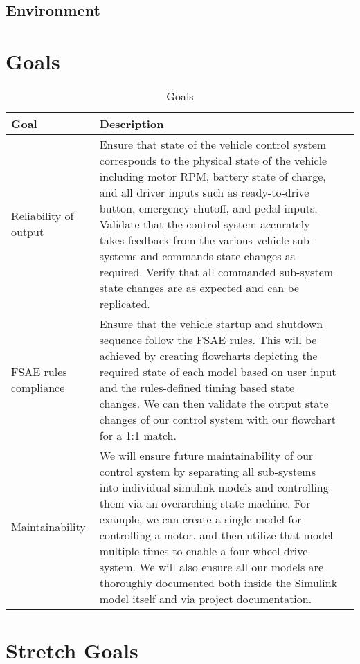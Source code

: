 \documentclass{article}
\begin{document}
\subsection{Environment}


\section{Goals}

\begin{table}[hp]
\caption{Goals} \label{TblGoals}
\begin{tabularx}{\textwidth}{llX}
\toprule
\textbf{Goal} & \textbf{Description}\\
\midrule
Reliability of output & Ensure that state of the vehicle 
control system corresponds to the physical state of the 
vehicle including motor RPM, battery state of charge, and 
all driver inputs such as ready-to-drive button, emergency shutoff, 
and pedal inputs. Validate that the control system accurately 
takes feedback from the various vehicle sub-systems and commands 
state changes as required. Verify that all commanded sub-system 
state changes are as expected and can be replicated. \\
FSAE rules compliance & Ensure that the vehicle startup and 
shutdown sequence follow the FSAE rules. This will be achieved by 
creating flowcharts depicting the required state of each model based 
on user input and the rules-defined timing based state changes. We can 
then validate the output state changes of our control system with our 
flowchart for a 1:1 match.\\
Maintainability & We will ensure future maintainability of our control 
system by separating all sub-systems into individual simulink models and 
controlling them via an overarching state machine. For example, we can 
create a single model for controlling a motor, and then utilize that 
model multiple times to enable a four-wheel drive system. We will also 
ensure all our models are thoroughly documented both inside the Simulink 
model itself and via project documentation.\\
\bottomrule
\end{tabularx}
\end{table}

\section{Stretch Goals}
\end{document}
